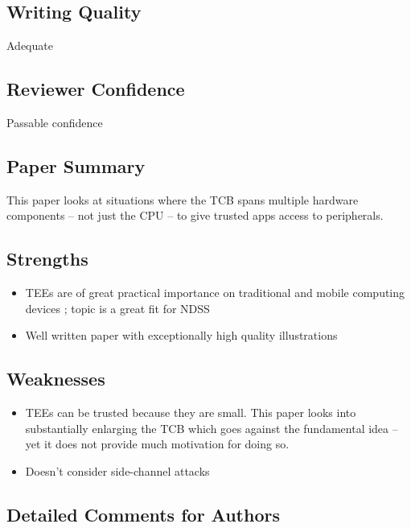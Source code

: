 \documentclass[9pt]{article}
\begin{document}
\subsection{Writing Quality}


  Adequate


\subsection{Reviewer Confidence}


  Passable confidence


\subsection{Paper Summary}

This paper looks at situations where the TCB spans multiple hardware
components -- not just the CPU -- to give trusted apps access to
peripherals.

\subsection{Strengths}

\begin{itemize}

\item
  TEEs are of great practical importance on traditional and mobile
  computing devices ; topic is a great fit for NDSS
\item
  Well written paper with exceptionally high quality illustrations
\end{itemize}

\subsection{Weaknesses}

\begin{itemize}

\item
  TEEs can be trusted because they are small. This paper looks into
  substantially enlarging the TCB which goes against the fundamental
  idea -- yet it does not provide much motivation for doing so.
\item
  Doesn't consider side-channel attacks
\end{itemize}

\subsection{Detailed Comments for Authors}
\end{document}
